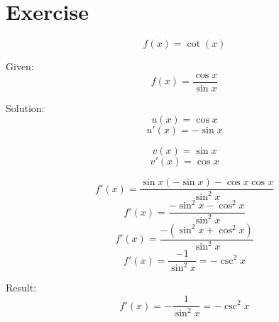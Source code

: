 \documentclass[a4paper, 10pt]{scrartcl}
\begin{document}
\section{Exercise}
\[f(x) = \cot(x)\]

Given:
\[f(x) = \frac{\cos{x}}{\sin{x}}\]

Solution:
\[u(x) = \cos{x}\]
\[u'(x) = -\sin{x}\]

\[v(x) = \sin{x}\]
\[v'(x) = \cos{x}\]

\[f'(x) = \frac{\sin{x}(-\sin{x}) - \cos{x}\cos{x}}{\sin^{2}{x}}\]
\[f'(x) = \frac{-\sin^{2}{x} - \cos^{2}{x}}{\sin^{2}{x}}\]
\[f'(x) = \frac{-(\sin^{2}{x} + \cos^{2}{x})}{\sin^{2}{x}}\]
\[f'(x) = \frac{-1}{\sin^{2}{x}} = -\csc^{2}{x}\]

Result:
\[f'(x) = -\frac{1}{\sin^{2}{x}} = -\csc^{2}{x}\]
\end{document}
